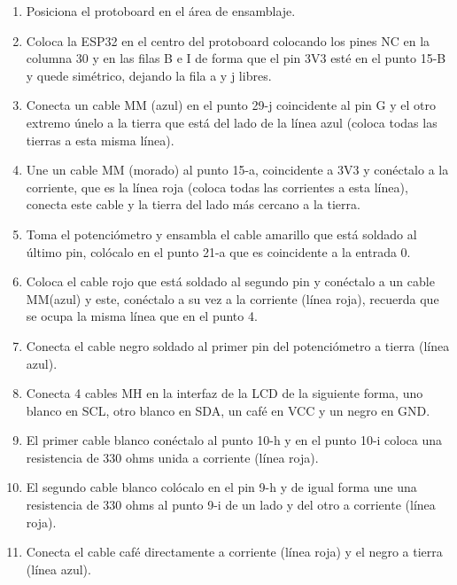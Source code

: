 \begin{enumerate}

    \item Posiciona el protoboard en el área de ensamblaje.

    \item Coloca la ESP32 en el centro del protoboard colocando los pines NC en la columna 30 y en las filas B e I de forma que el pin 3V3 esté en el punto 15-B y quede simétrico, dejando la fila a y j libres. 

    \item Conecta un cable MM (azul) en el punto 29-j coincidente al pin G y el otro extremo únelo a la tierra que está del lado de la línea azul (coloca todas las tierras a esta misma línea).

    \item Une un cable MM (morado) al punto 15-a, coincidente a 3V3 y conéctalo a la corriente, que es la línea roja (coloca todas las corrientes a esta línea), conecta este cable y la tierra del lado más cercano a la tierra. 

    \item Toma el potenciómetro y ensambla el cable amarillo que está soldado al último pin, colócalo en el punto 21-a que es coincidente a la entrada 0.

    \item Coloca el cable rojo que está soldado al segundo pin y conéctalo a un cable MM(azul) y este, conéctalo a su vez a la corriente (línea roja), recuerda que se ocupa la misma línea que en el punto 4. 

    \item Conecta el cable negro soldado al primer pin del potenciómetro a tierra (línea azul). 

    \item Conecta 4 cables MH en la interfaz de la LCD de la siguiente forma, uno blanco en SCL, otro blanco en SDA, un café en VCC y un negro en GND. 

    \item El primer cable blanco conéctalo al punto 10-h y en el punto 10-i coloca una resistencia de 330 ohms unida a corriente (línea roja).

    \item El segundo cable blanco colócalo en el pin 9-h y de igual forma une una resistencia de 330 ohms al punto 9-i de un lado y del otro a corriente (línea roja).

    \item Conecta el cable café directamente a corriente (línea roja) y el negro a tierra (línea azul). 


\end{enumerate}
